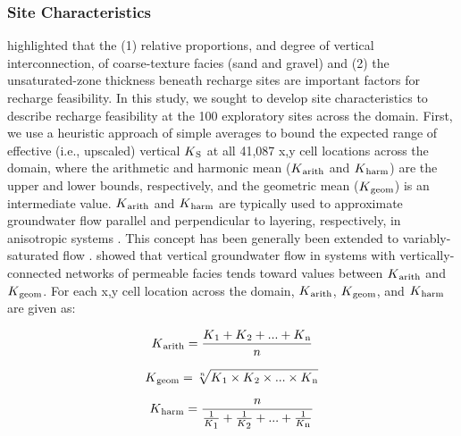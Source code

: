\subsubsection{Site Characteristics} \label{ssec:MM_site_char}

\cite{maples_2019} highlighted that the (1) relative proportions, and degree of vertical interconnection, of coarse-texture facies (sand and gravel) and (2) the unsaturated-zone thickness beneath recharge sites are important factors for recharge feasibility. In this study, we sought to develop site characteristics to describe recharge feasibility at the 100 exploratory sites across the domain. First, we use a heuristic approach of simple averages to bound the expected range of effective (i.e., upscaled) vertical $K\textsubscript{S}$ at all 41,087 x,y cell locations across the domain, where the arithmetic and harmonic mean ($K\textsubscript{arith}$ and $K\textsubscript{harm}$) are the upper and lower bounds, respectively, and the geometric mean ($K\textsubscript{geom}$) is an intermediate value. $K\textsubscript{arith}$ and $K\textsubscript{harm}$ are typically used to approximate groundwater flow parallel and perpendicular to layering, respectively, in anisotropic systems \citep{freeze1979groundwater}. This concept has been generally been extended to variably-saturated flow \citep{mualem1984anisotropy, yeh1985stochastic1, yeh1985stochastic3, assouline2006anisotropy}. \cite{fogg2000connected} showed that vertical groundwater flow in systems with vertically-connected networks of permeable facies tends toward values between $K\textsubscript{arith}$ and $K\textsubscript{geom}$. For each x,y cell location across the domain, $K\textsubscript{arith}$, $K\textsubscript{geom}$, and $K\textsubscript{harm}$ are given as:

\begin{equation}
K\textsubscript{arith} = \frac{K\textsubscript{1}+K\textsubscript{2}+...+K\textsubscript{n}}{n}
\label{Karith_eqn}
\end{equation}

\begin{equation}
K\textsubscript{geom} = {\sqrt[n]{K\textsubscript{1}\times K\textsubscript{2}\times ...\times K\textsubscript{n}}}
\label{Kgeom_eqn}
\end{equation}

\begin{equation}
K\textsubscript{harm} = \frac{n}{\frac{1}{K\textsubscript{1}}+\frac{1}{K\textsubscript{2}}+...+\frac{1}{K\textsubscript{n}}}
\label{Kharm_eqn}
\end{equation}

